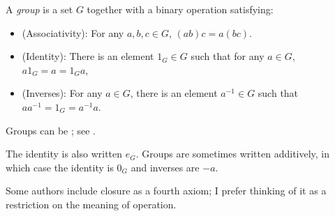 


\begin{dfn*}
	A \emph{group} is a set $G$ together with a binary operation satisfying:
	\begin{itemize}
		\item (Associativity): For any $a,b,c\in G$, $(ab)c = a(bc)$.
		\item (Identity): There is an element $1_G\in G$ such that for any $a\in G$, $a1_G = a = 1_Ga$,
		\item (Inverses): For any $a\in G$, there is an element $a^{-1}\in G$ such that
		      $aa^{-1} = 1_G = a^{-1}a$.
	\end{itemize}
\end{dfn*}

Groups can be ; see .

\begin{notation}
	The identity is also written $e_G$. Groups are sometimes written additively,
	in which case the identity is $0_G$ and inverses are $-a$.

	Some authors include closure as a fourth axiom; I prefer thinking of it as a
	restriction on the meaning of operation.
\end{notation}

